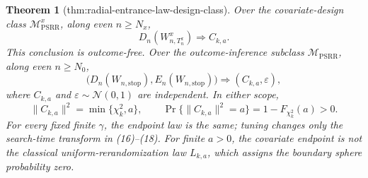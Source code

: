 \documentclass{article}
\newtheorem{theorem}{Theorem}
\begin{document}
\begin{theorem}[thm:radial-entrance-law-design-class]\label{thm:radial-entrance-law-design-class}
Over the covariate-design class \(\mathcal M_{\mathrm{PSRR}}^{x}\), along even \(n\ge N_x\),
\[
 D_n(W^x_{n,T_n^x})\Rightarrow C_{k,a}.
\]
This conclusion is outcome-free.  Over the outcome-inference subclass \(\mathcal M_{\mathrm{PSRR}}\), along even \(n\ge N_0\),
\[
 \bigl(D_n(W_{n,\mathrm{stop}}),E_n(W_{n,\mathrm{stop}})\bigr)
 \Rightarrow(C_{k,a},\varepsilon),
\]
where \(C_{k,a}\) and \(\varepsilon\sim\mathcal N(0,1)\) are independent.  In either scope,
\[
 \|C_{k,a}\|^2=\min\{\chi_k^2,a\},
 \qquad
 \Pr\{\|C_{k,a}\|^2=a\}=1-F_{\chi_k^2}(a)>0.
\]
For every fixed finite \(\gamma\), the endpoint law is the same; tuning changes only the search-time transform in (16)--(18).  For finite \(a>0\), the covariate endpoint is not the classical uniform-rerandomization law \(L_{k,a}\), which assigns the boundary sphere probability zero.
\end{theorem}
\end{document}
